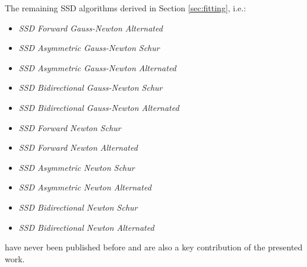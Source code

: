 The remaining SSD algorithms derived in Section \ref{sec:fitting}, i.e.:
\begin{itemize}
\item \emph{SSD Forward Gauss-Newton Alternated}
\item \emph{SSD Asymmetric Gauss-Newton Schur}
\item \emph{SSD Asymmetric Gauss-Newton Alternated}
\item \emph{SSD Bidirectional Gauss-Newton Schur}
\item \emph{SSD Bidirectional Gauss-Newton Alternated}
\item \emph{SSD Forward Newton Schur}
\item \emph{SSD Forward Newton Alternated}
\item \emph{SSD Asymmetric Newton Schur}
\item \emph{SSD Asymmetric Newton Alternated}
\item \emph{SSD Bidirectional Newton Schur}
\item \emph{SSD Bidirectional Newton Alternated}
\end{itemize}
have never been published before and are also a key contribution of the presented work.